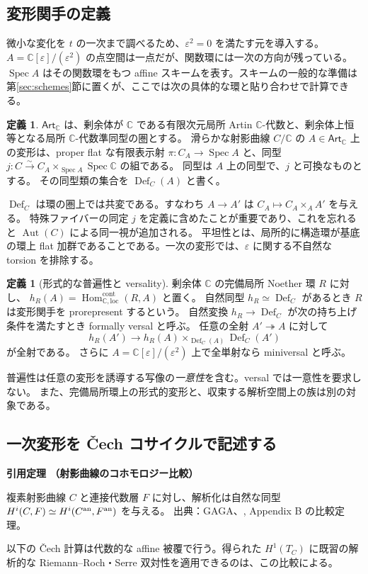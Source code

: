 \documentclass[dvipdfmx,a4paper,11pt]{article}
\theoremstyle{definition}
\newtheorem{dfn}[thm]{定義}
\newcommand{\C}{\mathbb C}\newcommand{\R}{\mathbb R}\newcommand{\Z}{\mathbb Z}\newcommand{\Q}{\mathbb Q}
\DeclareMathOperator{\Aut}{Aut}\DeclareMathOperator{\Pic}{Pic}\DeclareMathOperator{\Hom}{Hom}
\DeclareMathOperator{\Spec}{Spec}\DeclareMathOperator{\Proj}{Proj}\DeclareMathOperator{\GL}{GL}
\newcommand{\Art}{\mathsf{Art}_{\C}}
\newcommand{\Def}{\operatorname{Def}}
\newcommand{\eps}{\varepsilon}
\newenvironment{external}[1]{\Needspace{7\baselineskip}\refstepcounter{thm}\begin{tcolorbox}[mybox,colback=blue!2,colframe=blue!40!black]\textbf{引用定理 \thethm（#1）}\par}{\end{tcolorbox}}
\begin{document}
\subsection{変形関手の定義}
微小な変化を $t$ の一次まで調べるため、$\eps^2=0$ を満たす元を導入する。
$A=\C[\eps]/(\eps^2)$ の点空間は一点だが、関数環には一次の方向が残っている。
$\Spec A$ はその関数環をもつ affine スキームを表す。スキームの一般的な準備は第\ref{sec:schemes}節に置くが、ここでは次の具体的な環と貼り合わせで計算できる。

\begin{dfn}
$\Art$ は、剰余体が $\C$ である有限次元局所 Artin $\C$-代数と、剰余体上恒等となる局所 $\C$-代数準同型の圏とする。
滑らかな射影曲線 $C/\C$ の $A\in\Art$ 上の変形は、proper flat な有限表示射 $\pi:C_A\to\Spec A$ と、同型
$j:C\xrightarrow{\sim}C_A\times_{\Spec A}\Spec\C$ の組である。
同型は $A$ 上の同型で、$j$ と可換なものとする。
その同型類の集合を $\Def_C(A)$ と書く。
\end{dfn}
$\Def_C$ は環の圏上では共変である。すなわち $A\to A'$ は $C_A\mapsto C_A\times_AA'$ を与える。
特殊ファイバーの同定 $j$ を定義に含めたことが重要であり、これを忘れると $\Aut(C)$ による同一視が追加される。
平坦性とは、局所的に構造環が基底の環上 flat 加群であることである。一次の変形では、$\eps$ に関する不自然な torsion を排除する。

\begin{dfn}[形式的な普遍性と versality]
剰余体 $\C$ の完備局所 Noether 環 $R$ に対し、
$h_R(A)=\Hom_{\C,\mathrm{loc}}^{\mathrm{cont}}(R,A)$ と置く。
自然同型 $h_R\simeq\Def_C$ があるとき $R$ は変形関手を prorepresent するという。
自然変換 $h_R\to\Def_C$ が次の持ち上げ条件を満たすとき formally versal と呼ぶ。
任意の全射 $A'\twoheadrightarrow A$ に対して
\[
h_R(A')\longrightarrow h_R(A)\times_{\Def_C(A)}\Def_C(A')
\]
が全射である。
さらに $A=\C[\eps]/(\eps^2)$ 上で全単射なら miniversal と呼ぶ。
\end{dfn}
普遍性は任意の変形を誘導する写像の\emph{一意性}を含む。versal では一意性を要求しない。
また、完備局所環上の形式的変形と、収束する解析空間上の族は別の対象である。

\subsection{一次変形を Čech コサイクルで記述する}
\begin{external}{射影曲線のコホモロジー比較}
複素射影曲線 $C$ と連接代数層 $F$ に対し、解析化は自然な同型
$H^i(C,F)\simeq H^i(C^{\rm an},F^{\rm an})$ を与える。
出典：GAGA、\cite{Hartshorne}, Appendix B の比較定理。
\end{external}
以下の Čech 計算は代数的な affine 被覆で行う。得られた $H^1(T_C)$ に既習の解析的な Riemann--Roch・Serre 双対性を適用できるのは、この比較による。
\end{document}
